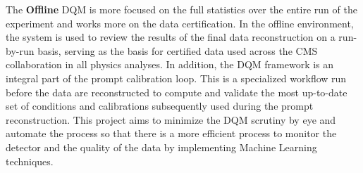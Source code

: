 The \textbf{Offline} DQM is more focused on the full statistics over the entire run of the experiment and works more on the data certification. In the offline environment, the system is used to review the results of the final data reconstruction on a run-by-run basis, serving as the basis for certified data used across the CMS collaboration in all physics analyses. In addition, the DQM framework is an integral part of the prompt calibration loop. This is a specialized workflow run before the data are reconstructed to compute and validate the most up-to-date set of conditions and calibrations subsequently used during the prompt reconstruction.
This project aims to minimize the DQM scrutiny by eye and automate the process so that there is a more efficient process to monitor the detector and the quality of the data by implementing Machine Learning techniques.